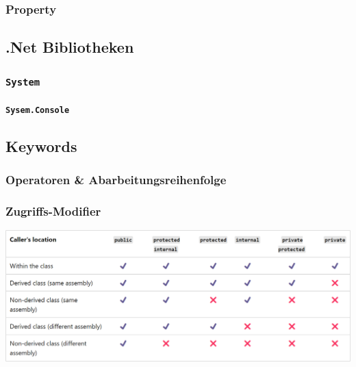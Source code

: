 \documentclass[
  9pt,
  a4paperpaper,
  DIV=11]{scrartcl}
\let\oldparagraph\paragraph
\renewcommand{\paragraph}[1]{\oldparagraph{#1}\mbox{}}
\numberwithin{equation}{section}
\begin{document}
\begin{multicols}{2}
\begin{tcolorbox}
\end{tcolorbox}

\hypertarget{property}{%
\subsubsection{Property}\label{property}}

\hypertarget{net-bibliotheken}{%
\subsection{.Net Bibliotheken}\label{net-bibliotheken}}

\hypertarget{system}{%
\subsubsection{\texorpdfstring{\texttt{System}}{System}}\label{system}}

\hypertarget{sysem.console}{%
\paragraph{\texorpdfstring{\texttt{Sysem.Console}}{Sysem.Console}}\label{sysem.console}}

\hypertarget{keywords}{%
\subsection{Keywords}\label{keywords}}

\hypertarget{operatoren-abarbeitungsreihenfolge}{%
\subsubsection{Operatoren \&
Abarbeitungsreihenfolge}\label{operatoren-abarbeitungsreihenfolge}}

\hypertarget{sec-modifier}{%
\subsubsection{Zugriffs-Modifier}\label{sec-modifier}}

\includegraphics{images/AccessModifiers.png}


\end{multicols}
\end{document}
